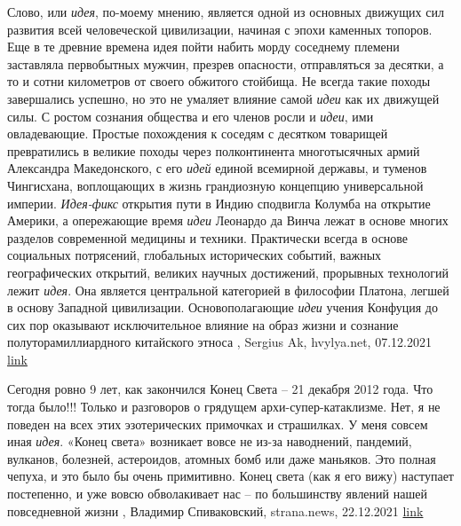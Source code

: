 Слово, или \emph{идея}, по-моему мнению, является одной из основных движущих сил
развития всей человеческой цивилизации, начиная с эпохи каменных топоров. Еще в
те древние времена идея пойти набить морду соседнему племени заставляла
первобытных мужчин, презрев опасности, отправляться за десятки, а то и сотни
километров от своего обжитого стойбища. Не всегда такие походы завершались
успешно, но это не умаляет влияние самой \emph{идеи} как их движущей силы. С ростом
сознания общества и его членов росли и \emph{идеи}, ими овладевающие. Простые
похождения к соседям с десятком товарищей превратились в великие походы через
полконтинента многотысячных армий Александра Македонского, с его \emph{идей} единой
всемирной державы, и туменов Чингисхана, воплощающих в жизнь грандиозную
концепцию универсальной империи. \emph{Идея-фикс} открытия пути в Индию сподвигла
Колумба на открытие Америки, а опережающие время \emph{идеи} Леонардо да Винча лежат в
основе многих разделов современной медицины и техники.
Практически всегда в основе социальных потрясений, глобальных исторических
событий, важных географических открытий, великих научных достижений, прорывных
технологий лежит \emph{идея}. Она является центральной категорией в философии Платона,
легшей в основу Западной цивилизации. Основополагающие \emph{идеи} учения Конфуция до
сих пор оказывают исключительное влияние на образ жизни и сознание
полуторамиллиардного китайского этноса
, 
Sergius Ak, hvylya.net, 07.12.2021
\href{https://hvylya.net/analytics/243091-ukraina-posle-zelenskogo}{link}

Сегодня ровно 9 лет, как закончился Конец Света – 21 декабря 2012 года.  Что
тогда было!!! Только и разговоров о грядущем архи-супер-катаклизме.
Нет, я не поведен на всех этих эзотерических примочках и страшилках. У меня
совсем иная \emph{идея}.  «Конец света» возникает вовсе не из-за наводнений,
пандемий, вулканов, болезней, астероидов, атомных бомб или даже маньяков. Это
полная чепуха, и это было бы очень примитивно.  Конец света (как я его вижу)
наступает постепенно, и уже вовсю обволакивает нас – по большинству явлений
нашей повседневной жизни
, 
Владимир Спиваковский, strana.news, 22.12.2021
\href{https://strana.news/opinions/368254-konets-sveta-nastupaet-postepenno-obvolakivaja-vsekh-nas.html}{link}

